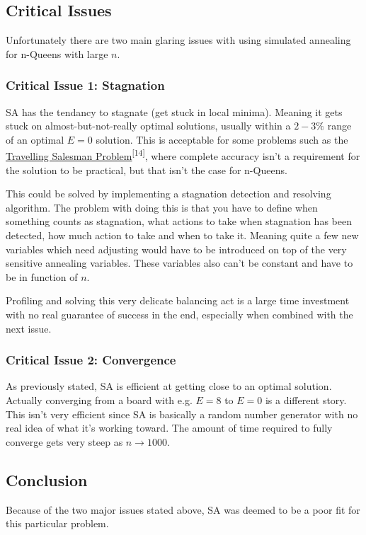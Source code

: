 \documentclass{article}
\begin{document}
\subsection{Critical Issues}
Unfortunately there are two main glaring issues with using simulated annealing for n-Queens with large \(n\).

\subsubsection{Critical Issue 1: Stagnation}
SA has the tendancy to stagnate (get stuck in local minima). Meaning it gets stuck on almost-but-not-really optimal solutions,
usually within a \(2-3\%\) range of an optimal \(E = 0\) solution.
This is acceptable for some problems such as the \href{https://en.wikipedia.org/wiki/Travelling_salesman_problem}{Travelling Salesman Problem}\textsuperscript{[14]},
where complete accuracy isn't a requirement for the solution to be practical, but that isn't the case for n-Queens.

This could be solved by implementing a stagnation detection and resolving algorithm.
The problem with doing this is that you have to define when something counts as stagnation,
what actions to take when stagnation has been detected, how much action to take and when to take it.
Meaning quite a few new variables which need adjusting would have to be introduced on top of the very sensitive annealing variables.
These variables also can't be constant and have to be in function of \(n\).

Profiling and solving this very delicate balancing act is a large time investment with no real guarantee of success in the end,
especially when combined with the next issue.

\subsubsection{Critical Issue 2: Convergence}
As previously stated, SA is efficient at getting close to an optimal solution.
Actually converging from a board with e.g. \(E=8\) to \(E=0\) is a different story.
This isn't very efficient since SA is basically a random number generator with no real idea of what it's working toward.
The amount of time required to fully converge gets very steep as \(n \to 1000\).

\subsection{Conclusion}
Because of the two major issues stated above, SA was deemed to be a poor fit for this particular problem.
\end{document}
